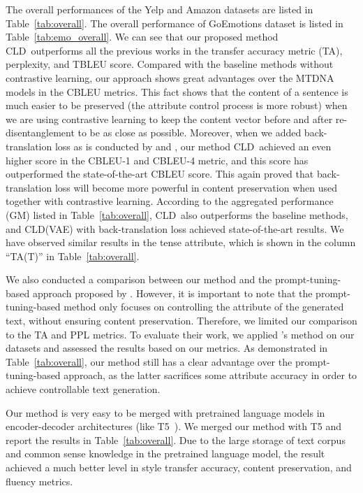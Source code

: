 \documentclass[11pt,a4paper]{article}
\newcommand{\Mname}{CLD}
\renewcommand{\cite}{\citep}
\begin{document}
The overall performances of the Yelp and Amazon datasets are listed in Table~\ref{tab:overall}.  The overall performance of GoEmotions dataset is listed in Table~\ref{tab:emo_overall}. We can see that our proposed method \Mname\ outperforms all the previous works in the transfer accuracy metric (TA), perplexity, and TBLEU score. Compared with the baseline methods without contrastive learning, our approach shows great advantages over the MTDNA~\cite{sha2021multi} models in the CBLEU metrics. This fact shows that the content of a sentence is much easier to be preserved (the attribute control process is more robust) when we are using contrastive learning  to keep the content vector before and after re-disentanglement to be as close as possible.  Moreover, when we added back-translation loss as is conducted by  and , our method \Mname\ achieved an even higher score in the CBLEU-1  and CBLEU-4 metric,  and this score has outperformed the state-of-the-art CBLEU score. This again proved that back-translation loss  will become more powerful in content preservation when used together with contrastive learning. According to the aggregated performance (GM) listed in Table~\ref{tab:overall}, \Mname\ also outperforms the baseline methods, and \Mname(VAE) with  back-translation loss achieved state-of-the-art results. We have observed similar results in the tense attribute, which is shown in the column ``TA(T)'' in Table~\ref{tab:overall}.

We also conducted a comparison between our method and the prompt-tuning-based approach proposed by . However, it is important to note that the prompt-tuning-based method only focuses on controlling the attribute of the generated text, without ensuring content preservation. Therefore, we limited our comparison to the TA and PPL metrics. To evaluate their work, we applied 's method on our datasets and assessed the results based on our metrics. As demonstrated in Table~\ref{tab:overall}, our method still has a clear advantage over the prompt-tuning-based approach, as the latter sacrifices some attribute accuracy in order to achieve controllable text generation.

Our method is very easy to be merged with pretrained  language models in encoder-decoder architectures (like T5~\cite{raffel2020exploring}). We merged our  method with T5 and report the results in Table~\ref{tab:overall}. Due to the large storage of text corpus and common sense knowledge in the pretrained language model, the result achieved a much better level in style transfer accuracy, content preservation, and fluency metrics.
\end{document}
